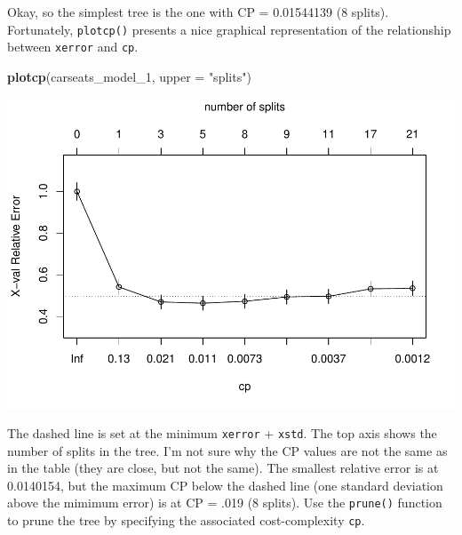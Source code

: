 \documentclass[]{book}
\newenvironment{Shaded}{\begin{snugshade}}{\end{snugshade}}
\newcommand{\DataTypeTok}[1]{\textcolor[rgb]{0.13,0.29,0.53}{#1}}
\newcommand{\DecValTok}[1]{\textcolor[rgb]{0.00,0.00,0.81}{#1}}
\newcommand{\KeywordTok}[1]{\textcolor[rgb]{0.13,0.29,0.53}{\textbf{#1}}}
\newcommand{\NormalTok}[1]{#1}
\newcommand{\OperatorTok}[1]{\textcolor[rgb]{0.81,0.36,0.00}{\textbf{#1}}}
\newcommand{\OtherTok}[1]{\textcolor[rgb]{0.56,0.35,0.01}{#1}}
\newcommand{\StringTok}[1]{\textcolor[rgb]{0.31,0.60,0.02}{#1}}
\begin{document}
Okay, so the simplest tree is the one with CP = 0.01544139 (8 splits). Fortunately, \texttt{plotcp()} presents a nice graphical representation of the relationship between \texttt{xerror} and \texttt{cp}.

\begin{Shaded}
\begin{Highlighting}[]
\KeywordTok{plotcp}\NormalTok{(carseats_model_}\DecValTok{1}\NormalTok{, }\DataTypeTok{upper =} \StringTok{"splits"}\NormalTok{)}
\end{Highlighting}
\end{Shaded}

\includegraphics{data-sci_files/figure-latex/unnamed-chunk-66-1.pdf}

The dashed line is set at the minimum \texttt{xerror} + \texttt{xstd}. The top axis shows the number of splits in the tree. I'm not sure why the CP values are not the same as in the table (they are close, but not the same). The smallest relative error is at 0.0140154, but the maximum CP below the dashed line (one standard deviation above the mimimum error) is at CP = .019 (8 splits). Use the \texttt{prune()} function to prune the tree by specifying the associated cost-complexity \texttt{cp}.

\begin{Shaded}
\end{Shaded}
\end{document}
